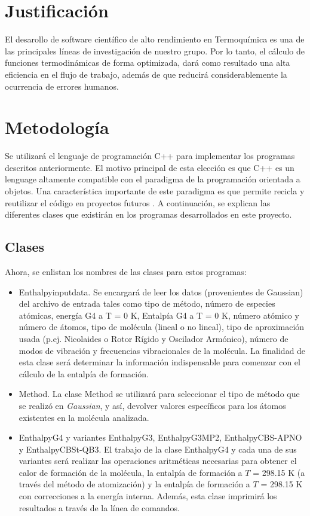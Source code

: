 \documentclass[12pt]{article}
\begin{document}
\section*{Justificación}
El desarollo de software científico de alto rendimiento en Termoquímica es una de
las principales líneas de investigación de nuestro grupo. Por lo tanto, el cálculo
de funciones termodinámicas de forma optimizada, dará como resultado una alta
eficiencia en el flujo de trabajo, además de que
reducirá considerablemente la ocurrencia de errores humanos. 


\section*{Metodología}
Se utilizará el lenguaje de programación C++ para implementar los programas descritos anteriormente. El motivo principal de esta elección es que C++ es un lenguage altamente compatible con el
paradigma de la programación orientada a objetos. Una característica importante de este paradigma
es que permite recicla y reutilizar el código en proyectos futuros \cite{cplusplus}. A continuación, se explican las diferentes clases que existirán en los programas desarrollados en este proyecto.

\subsection*{Clases}
Ahora, se enlistan los nombres de las clases para estos programas:
\begin{itemize}
	\item Enthalpyinputdata. Se encargará de leer los datos (provenientes de Gaussian) del archivo de entrada tales como tipo de método, número de especies atómicas, energía G4 a T = 0 K, Entalpía G4 a T = 0 K,
	número atómico y número de átomos, tipo de molécula (lineal o no lineal), tipo de
	aproximación usada (p.ej. Nicolaides o Rotor Rígido y Oscilador Armónico), número de
	modos de vibración y frecuencias vibracionales de la molécula. La finalidad de esta clase
	será determinar la información indispensable para comenzar con el cálculo de la
	entalpía de formación.
	\item Method. La clase Method se utilizará para seleccionar el tipo de método que
	se realizó en \textit{Gaussian}, y así, devolver valores específicos
	para los átomos existentes en la molécula analizada.
	\item EnthalpyG4 y variantes EnthalpyG3, EnthalpyG3MP2, EnthalpyCBS-APNO y
	\-Ent\-halp\-y\-CBSt-QB3.
	El trabajo de la clase EnthalpyG4 y cada una de sus variantes será realizar las operaciones 
	aritméticas necesarias para obtener el calor de formación de la  molécula,
	la entalpía de formación a
	$T$ = 298.15 K (a través del método de atomización) y la entalpía de formación a
	$T$ = 298.15 K con correcciones a la energía interna.
	Además, esta clase imprimirá los resultados a través de la línea de comandos.
\end{itemize}
\end{document}
